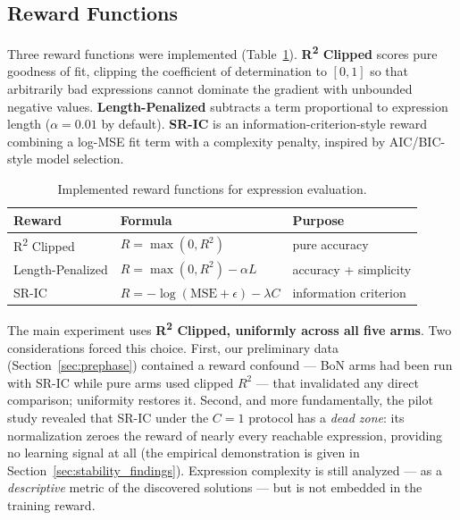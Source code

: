 \subsection{Reward Functions}
\label{sec:reward_functions}

Three reward functions were implemented (Table~\ref{tab:reward_functions}). \textbf{R\textsuperscript{2} Clipped} scores pure goodness of fit, clipping the coefficient of determination to $[0,1]$ so that arbitrarily bad expressions cannot dominate the gradient with unbounded negative values. \textbf{Length-Penalized} subtracts a term proportional to expression length ($\alpha = 0.01$ by default). \textbf{SR-IC} is an information-criterion-style reward combining a log-MSE fit term with a complexity penalty, inspired by AIC/BIC-style model selection.

\begin{table}[htbp]
    \centering
    \caption{Implemented reward functions for expression evaluation.}
    \label{tab:reward_functions}
    \begin{tabular}{lll}
    \toprule
    \textbf{Reward} & \textbf{Formula} & \textbf{Purpose} \\
    \midrule
    R\textsuperscript{2} Clipped & $R = \max(0, R^2)$ & pure accuracy \\
    Length-Penalized & $R = \max(0, R^2) - \alpha L$ & accuracy + simplicity \\
    SR-IC & $R = -\log(\text{MSE} + \epsilon) - \lambda C$ & information criterion \\
    \bottomrule
    \end{tabular}
\end{table}

The main experiment uses \textbf{R\textsuperscript{2} Clipped, uniformly across all five arms}. Two considerations forced this choice. First, our preliminary data (Section~\ref{sec:prephase}) contained a reward confound --- BoN arms had been run with SR-IC while pure arms used clipped $R^2$ --- that invalidated any direct comparison; uniformity restores it. Second, and more fundamentally, the pilot study revealed that SR-IC under the $C=1$ protocol has a \emph{dead zone}: its normalization zeroes the reward of nearly every reachable expression, providing no learning signal at all (the empirical demonstration is given in Section~\ref{sec:stability_findings}). Expression complexity is still analyzed --- as a \emph{descriptive} metric of the discovered solutions --- but is not embedded in the training reward.


